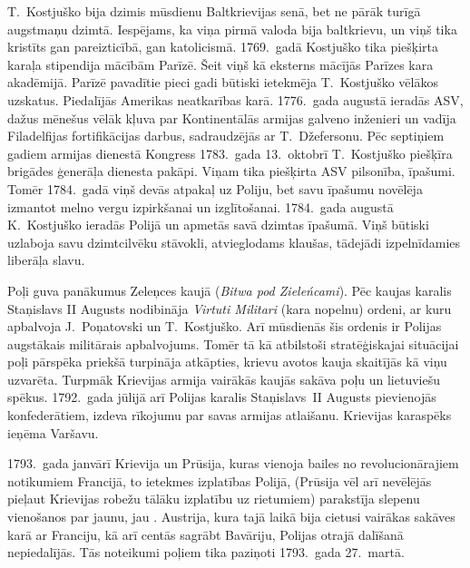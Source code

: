 \documentclass[twoside,a5paper,12pt,fleqn,openany]{extbook}
\newcommand{\pltxti}[1]{\textit{\textpolish{#1}}}
\newcommand{\latxti}[1]{\textit{\textlatin{#1}}}
\begin{document}
T.~Kostjuško bija dzimis mūsdienu Baltkrievijas senā, bet ne pārāk turīgā augstmaņu dzimtā. Iespējams, ka viņa pirmā valoda bija baltkrievu, un viņš tika kristīts gan pareizticībā, gan katolicismā. 1769.~gadā Kostjuško tika piešķirta karaļa stipendija mācībām Parīzē. Šeit viņš kā eksterns mācījās Parīzes kara akadēmijā. Parīzē pavadītie pieci gadi būtiski ietekmēja T.~Kostjuško vēlākos uzskatus. Piedalījās Amerikas neatkarības karā. 1776.~gada augustā ieradās ASV, dažus mēnešus vēlāk kļuva par Kontinentālās armijas galveno inženieri un vadīja Filadelfijas fortifikācijas darbus, sadraudzējās ar T.~Džefersonu. Pēc septiņiem gadiem armijas dienestā Kongress 1783.~gada 13.~oktobrī T.~Kostjuško piešķīra brigādes ģenerāļa dienesta pakāpi. Viņam tika piešķirta ASV pilsonība, īpašumi. Tomēr 1784.~gadā viņš devās atpakaļ uz Poliju, bet savu īpašumu novēlēja izmantot melno vergu izpirkšanai un izglītošanai. 1784.~gada augustā K.~Kostjuško ieradās Polijā un apmetās savā dzimtas īpašumā. Viņš būtiski uzlaboja savu dzimtcilvēku stāvokli, atvieglodams klaušas, tādejādi izpelnīdamies liberāļa slavu.

Poļi guva panākumus Zeleņces kaujā (\pltxti{Bitwa pod Zieleńcami}). Pēc kaujas karalis Staņislavs II Augusts nodibināja \latxti{Virtuti Militari} (kara nopelnu) ordeni, ar kuru apbalvoja J.~Poņatovski un T.~Kostjuško. Arī mūsdienās šis ordenis ir Polijas augstākais militārais apbalvojums. Tomēr tā kā atbilstoši stratēģiskajai situācijai poļi pārspēka priekšā turpināja atkāpties, krievu avotos kauja skaitījās kā viņu uzvarēta. Turpmāk Krievijas armija vairākās kaujās sakāva poļu un lietuviešu spēkus. 1792.~gada jūlijā arī Polijas karalis Staņislavs~II Augusts pievienojās konfederātiem, izdeva rīkojumu par savas armijas atlaišanu. Krievijas karaspēks ieņēma Varšavu.

1793.~gada janvārī Krievija un Prūsija, kuras vienoja bailes no revolucionārajiem notikumiem Francijā, to ietekmes izplatības Polijā, (Prūsija vēl arī nevēlējās pieļaut Krievijas robežu tālāku izplatību uz rietumiem) parakstīja slepenu vienošanos par jaunu, jau . Austrija, kura tajā laikā bija cietusi vairākas sakāves karā ar Franciju, kā arī centās sagrābt Bavāriju, Polijas otrajā dalīšanā nepiedalījās. Tās noteikumi poļiem tika paziņoti 1793.~gada 27.~martā.
\end{document}
